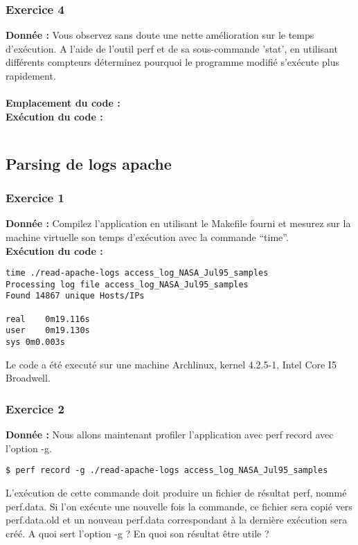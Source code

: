 \color{red}
\subsubsection{Exercice 4}
\textbf{Donnée : } Vous	observez	sans	doute	une	nette	amélioration	sur	le	temps	d'exécution.
A	l'aide	de	l'outil	perf	et	de	sa	sous-commande	'stat',	en	utilisant	différents	compteurs	déterminez	
pourquoi	le	programme	modifié	s'exécute	plus	rapidement.\\\\
\textbf{Emplacement du code : } \textit{}\\

\textbf{Exécution du code : } \\
\begin{lstlisting}

\end{lstlisting}
\color{black}

\subsection{Parsing de logs apache}
\subsubsection{Exercice 1}
\textbf{Donnée : } Compilez	l'application	en	utilisant	le	Makefile	fourni	et	mesurez sur	la	machine	virtuelle son	temps	
d'exécution	avec	la	commande	“time”.\\

\textbf{Exécution du code : } \\
\begin{lstlisting}
time ./read-apache-logs access_log_NASA_Jul95_samples 
Processing log file access_log_NASA_Jul95_samples
Found 14867 unique Hosts/IPs

real	0m19.116s
user	0m19.130s
sys	0m0.003s
\end{lstlisting}
Le code a été executé sur une machine Archlinux, kernel 4.2.5-1, Intel Core I5 Broadwell.

\subsubsection{Exercice 2}
\textbf{Donnée : } Nous	allons	maintenant	profiler	l'application	avec	perf	record	avec	l'option	-g.
\begin{lstlisting}
$ perf record -g ./read-apache-logs access_log_NASA_Jul95_samples
\end{lstlisting}
L'exécution	de	cette	commande	doit	produire	un	fichier	de	résultat	perf,	nommé	perf.data.	Si	l'on	
exécute	une	nouvelle	fois	la	commande,	ce	fichier	sera	copié	vers	perf.data.old et	un	nouveau	
perf.data	correspondant	à	la	dernière	exécution	sera	créé.
A	quoi	sert	l'option	-g	?	En	quoi	son	résultat	être	utile	?\\

